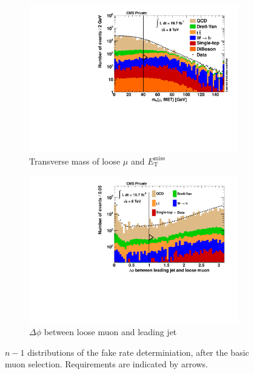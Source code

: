 \begin{figure}[!ht]
  \ContinuedFloat
  \centering
  \begin{subfigure}[b]{0.495\textwidth}
    \centering
    \includegraphics[width=\textwidth]{plots/nTL_mt.pdf}
    \caption{Transverse mass of loose $\mu$ and $E_{\text{T}}^{\text{miss}}$ \label{fig:ntlmt}}
  \end{subfigure}
  \begin{subfigure}[b]{0.495\textwidth}
    \centering
    \includegraphics[width=\textwidth]{plots/nTL_jetdphi.pdf}
    \caption{$\Delta \phi$ between loose muon and leading jet \label{fig:ntljetdphi}}
  \end{subfigure}

  \caption{$n - 1$ distributions of the fake rate determiniation, after the basic muon selection. Requirements are indicated by arrows.}
  \label{fig:ntl}
\end{figure}

